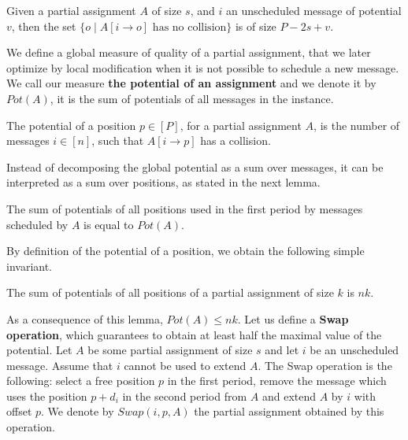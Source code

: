 \documentclass[a4paper,UKenglish,cleveref, autoref, thm-restate]{lipics-v2019}
\begin{document}
\begin{lemma}
Given a partial assignment $A$ of size $s$, and $i$ an unscheduled message of potential 
$v$, then the set $\{o \mid A[i \rightarrow o] \text{ has no collision}\}$ is of size $P - 2s + v$.
\end{lemma}

We define a global measure of quality of a partial assignment, 
that we later optimize by local modification when it is not possible to schedule a new message. 
We call our measure \textbf{the potential of an assignment} and we denote it by $Pot(A)$, it is the sum of potentials of all messages in the instance.


\begin{definition}
The potential of a position $p \in [P]$, for a partial assignment $A$, is the number of messages $i \in [n]$, such that 
$A[i \rightarrow p]$ has a collision. 
\end{definition}


Instead of decomposing the global potential as a sum over messages, it can be interpreted
as a sum over positions, as stated in the next lemma.

\begin{lemma}\label{lemma:pot_pos}
The sum of potentials of all positions used in the first period by messages scheduled by $A$ is equal to $Pot(A)$.  
\end{lemma}

By definition of the potential of a position, we obtain the following simple invariant.

\begin{lemma}\label{lemma:inv}
The sum of potentials of all positions of a partial assignment of size $k$ is $nk$.  
\end{lemma}

 As a consequence of this lemma, $Pot(A) \leq nk$. Let us define a \textbf{Swap operation},
 which guarantees to obtain at least half the maximal value of the potential.
Let $A$ be some partial assignment of size $s$ and let $i$ be an unscheduled message. 
Assume that $i$ cannot be used to extend $A$. The Swap operation is the following: 
select a free position $p$ in the first period, remove the message which uses the position $p+d_i$ in the second period from $A$ and extend $A$ by $i$ with offset $p$. We denote by $Swap(i,p,A)$ the partial assignment obtained by this operation.
\end{document}

